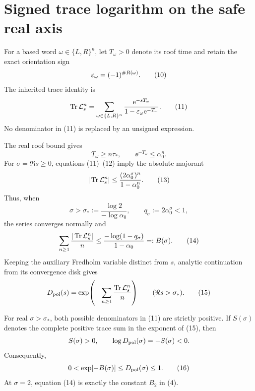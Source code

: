 \section{Signed trace logarithm on the safe real axis}

For a based word \(\omega\in\{L,R\}^n\), let \(T_\omega>0\) denote its roof
time and retain the exact orientation sign
\[
 \varepsilon_\omega=(-1)^{\#R(\omega)}.
 \tag{10}
\]
The inherited trace identity is
\[
 \operatorname{Tr}\mathcal L_s^n
 =\sum_{\omega\in\{L,R\}^n}
 \frac{\mathrm e^{-sT_\omega}}
 {1-\varepsilon_\omega\mathrm e^{-T_\omega}}.
 \tag{11}
\]
No denominator in (11) is replaced by an unsigned expression.

The real roof bound gives
\[
 T_\omega\ge n\tau_*,
 \qquad
 \ee^{-T_\omega}\le\alpha_0^n.
 \tag{12}
\]
For \(\sigma=\Re s\ge0\), equations (11)--(12) imply the absolute
majorant
\[
 |\operatorname{Tr}\mathcal L_s^n|
 \le \frac{(2\alpha_0^\sigma)^n}{1-\alpha_0^n}.
 \tag{13}
\]
Thus, when
\[
 \sigma>\sigma_*:=\frac{\log2}{-\log\alpha_0},
 \qquad q_\sigma:=2\alpha_0^\sigma<1,
\]
the series converges normally and
\[
 \sum_{n\ge1}\frac{|\operatorname{Tr}\mathcal L_s^n|}{n}
 \le
 \frac{-\log(1-q_\sigma)}{1-\alpha_0}
 =:B(\sigma).
 \tag{14}
\]
Keeping the auxiliary Fredholm variable distinct from \(s\), analytic
continuation from its convergence disk gives
\[
 D_{\mathrm{pol}}(s)=\exp\!\left(
 -\sum_{n\ge1}\frac{\operatorname{Tr}\mathcal L_s^n}{n}
 \right)
 \qquad(\Re s>\sigma_*).
 \tag{15}
\]

For real \(\sigma>\sigma_*\), both possible denominators in (11) are
strictly positive.  If \(S(\sigma)\) denotes the complete positive trace sum
in the exponent of (15), then
\[
 S(\sigma)>0,
 \qquad
 \log D_{\mathrm{pol}}(\sigma)=-S(\sigma)<0.
\]
Consequently,
\[
 0<\exp[-B(\sigma)]\le D_{\mathrm{pol}}(\sigma)\le1.
 \tag{16}
\]
At \(\sigma=2\), equation (14) is exactly the constant \(B_2\) in (4).
